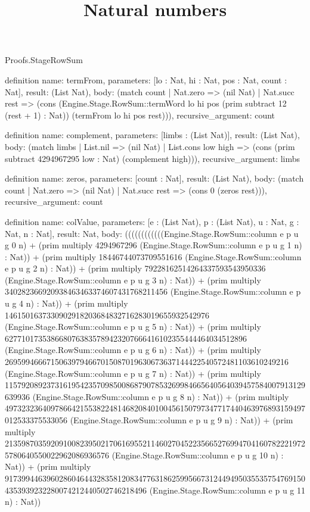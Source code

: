 \begin{lexlean}{Proofs.StageRowSum}
\title{Natural numbers}
\begin{semanticmodule}
definition{
  name: termFrom,
  parameters: [lo : Nat, hi : Nat, pos : Nat, count : Nat],
  result: (List Nat),
  body: (match count
    | Nat.zero => (nil Nat)
    | Nat.succ rest => (cons (Engine.Stage.RowSum::termWord lo hi pos (prim subtract 12 (rest + 1) : Nat)) (termFrom lo hi pos rest))),
  recursive_argument: count
}

definition{
  name: complement,
  parameters: [limbs : (List Nat)],
  result: (List Nat),
  body: (match limbs
    | List.nil => (nil Nat)
    | List.cons low high => (cons (prim subtract 4294967295 low : Nat) (complement high))),
  recursive_argument: limbs
}

definition{
  name: zeros,
  parameters: [count : Nat],
  result: (List Nat),
  body: (match count | Nat.zero => (nil Nat) | Nat.succ rest => (cons 0 (zeros rest))),
  recursive_argument: count
}

definition{
  name: colValue,
  parameters: [e : (List Nat), p : (List Nat), u : Nat, g : Nat, n : Nat],
  result: Nat,
  body: ((((((((((((Engine.Stage.RowSum::column e p u g 0 n) + (prim multiply 4294967296 (Engine.Stage.RowSum::column e p u g 1 n) : Nat)) + (prim multiply 18446744073709551616 (Engine.Stage.RowSum::column e p u g 2 n) : Nat)) + (prim multiply 79228162514264337593543950336 (Engine.Stage.RowSum::column e p u g 3 n) : Nat)) + (prim multiply 340282366920938463463374607431768211456 (Engine.Stage.RowSum::column e p u g 4 n) : Nat)) + (prim multiply 1461501637330902918203684832716283019655932542976 (Engine.Stage.RowSum::column e p u g 5 n) : Nat)) + (prim multiply 6277101735386680763835789423207666416102355444464034512896 (Engine.Stage.RowSum::column e p u g 6 n) : Nat)) + (prim multiply 26959946667150639794667015087019630673637144422540572481103610249216 (Engine.Stage.RowSum::column e p u g 7 n) : Nat)) + (prim multiply 115792089237316195423570985008687907853269984665640564039457584007913129639936 (Engine.Stage.RowSum::column e p u g 8 n) : Nat)) + (prim multiply 497323236409786642155382248146820840100456150797347717440463976893159497012533375533056 (Engine.Stage.RowSum::column e p u g 9 n) : Nat)) + (prim multiply 2135987035920910082395021706169552114602704522356652769947041607822219725780640550022962086936576 (Engine.Stage.RowSum::column e p u g 10 n) : Nat)) + (prim multiply 9173994463960286046443283581208347763186259956673124494950355357547691504353939232280074212440502746218496 (Engine.Stage.RowSum::column e p u g 11 n) : Nat))
}


\end{semanticmodule}
\end{lexlean}
